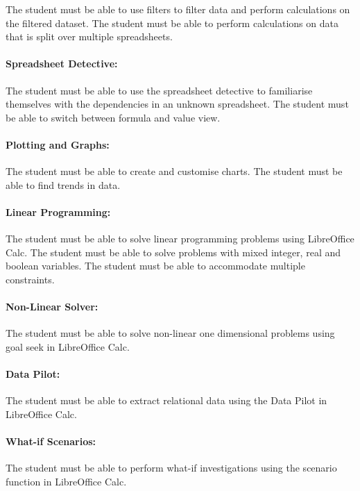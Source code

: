                 The student must be able to use filters to filter data and perform
                calculations on the filtered dataset. The student must be able to
                perform calculations on data that is split over multiple
                spreadsheets.

            \paragraph{Spreadsheet Detective:}
                The student must be able to use the spreadsheet detective to
                familiarise themselves with the dependencies in an unknown
                spreadsheet. The student must be able to switch between formula
                and value view.

            \paragraph{Plotting and Graphs:}
                The student must be able to create and customise charts. The
                student must be able to find trends in data.

            \paragraph{Linear Programming:}
                The student must be able to solve linear programming problems
                using LibreOffice Calc. The student must be able to solve
                problems with mixed integer, real and boolean variables. The
                student must be able to accommodate multiple constraints.

            \paragraph{Non-Linear Solver:}
                The student must be able to solve non-linear one dimensional
                problems using goal seek in LibreOffice Calc.

            \paragraph{Data Pilot:}
                The student must be able to extract relational data using the Data
                Pilot in LibreOffice Calc.

            \paragraph{What-if Scenarios:}
                The student must be able to perform what-if investigations using
                the scenario function in LibreOffice Calc.

